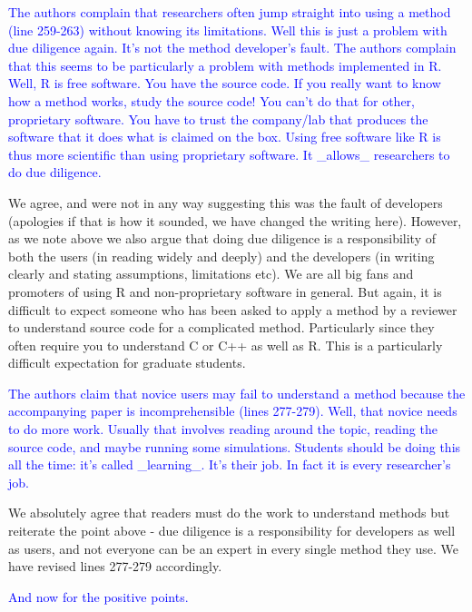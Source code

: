 \documentclass[12pt]{letter}
\begin{document}
\begin{letter}{}
\textcolor{blue}{The authors complain that researchers often jump straight into using a method (line 259-263) without knowing its limitations. Well this is just a problem with due diligence again. It's not the method developer's fault. The authors complain that this seems to be particularly a problem with methods implemented in R. Well, R is free software. You have the source code. If you really want to know how a method works, study the source code! You can't do that for other, proprietary software. You have to trust the company/lab that produces the software that it does what is claimed on the box. Using free software like R is thus more scientific than using proprietary software. It \_allows\_ researchers to do due diligence.}

We agree, and were not in any way suggesting this was the fault of developers (apologies if that is how it sounded, we have changed the writing here). However, as we note above we also argue that doing due diligence is a responsibility of both the users (in reading widely and deeply) and the developers (in writing clearly and stating assumptions, limitations etc). We are all big fans and promoters of using R and non-proprietary software in general. But again, it is difficult to expect someone who has been asked to apply a method by a reviewer to understand source code for a complicated method. Particularly since they often require you to understand C or C++ as well as R. This is a particularly difficult expectation for graduate students.

\textcolor{blue}{The authors claim that novice users may fail to understand a method because the accompanying paper is incomprehensible (lines 277-279). Well, that novice needs to do more work. Usually that involves reading around the topic, reading the source code, and maybe running some simulations. Students should be doing this all the time: it's called \_learning\_. It's their job. In fact it is every researcher's job.}

We absolutely agree that readers must do the work to understand methods but reiterate the point above - due diligence is a responsibility for developers as well as users, and not everyone can be an expert in every single method they use. We have revised lines 277-279 accordingly.

\textcolor{blue}{And now for the positive points.}


\end{letter}
\end{document}
